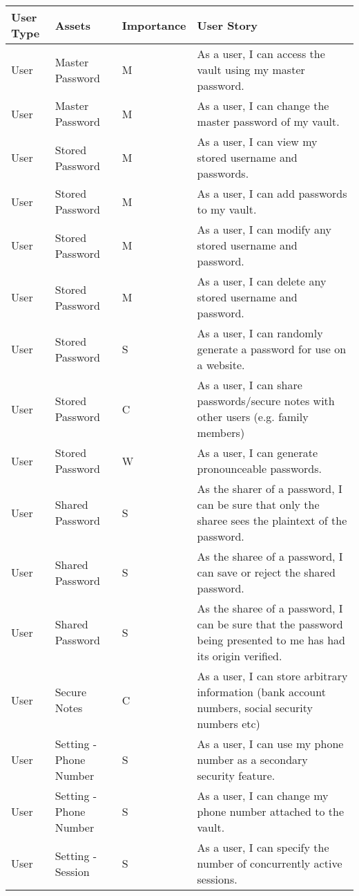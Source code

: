 \documentclass{article}
\begin{document}
\begin{table}[H]
  \centering
  {
    \renewcommand\arraystretch{1.25}
    \begin{tabular}{>{\centering}m{1cm} >{\centering}m{4cm} >{\centering}m{2cm} >{\centering\arraybackslash}m{8cm} }
    \toprule
    User Type & Assets & Importance & User Story \\
    \midrule
    User & Master Password & M & As a user, I can access the vault using my master password. \\
    User & Master Password & M & As a user, I can change the master password of my vault. \\
    User & Stored Password & M & As a user, I can view my stored username and passwords. \\
    User & Stored Password & M & As a user, I can add passwords to my vault. \\
    User & Stored Password & M & As a user, I can modify any stored username and password. \\
    User & Stored Password & M & As a user, I can delete any stored username and password. \\
    User & Stored Password & S & As a user, I can randomly generate a password for use on a website. \\
    User & Stored Password & C & As a user, I can share passwords/secure notes with other users (e.g. family members) \\
    User & Stored Password & W & As a user, I can generate pronounceable passwords. \\
    User & Shared Password & S & As the sharer of a password, I can be sure that only the sharee sees the plaintext of the password. \\
    User & Shared Password & S & As the sharee of a password, I can save or reject the shared password. \\
    User & Shared Password & S & As the sharee of a password, I can be sure that the password being presented to me has had its origin verified. \\
    User & Secure Notes & C & As a user, I can store arbitrary information (bank account numbers, social security numbers etc) \\
    User & Setting - Phone Number & S & As a user, I can use my phone number as a secondary security feature. \\
    User & Setting - Phone Number & S & As a user, I can change my phone number attached to the vault. \\
    User & Setting - Session & S & As a user, I can specify the number of concurrently active sessions.\\

\end{tabular}}
\end{table}
\end{document}
